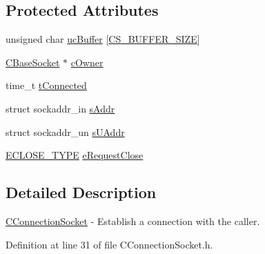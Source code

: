 \subsection*{\-Protected \-Attributes}
\begin{DoxyCompactItemize}
\item 
unsigned char \hyperlink{class_c_connection_socket_abc2fd15e5e9f2f3e112012bdbe0b5c94}{uc\-Buffer} \mbox{[}\hyperlink{class_c_connection_socket_a0d76efb3e65e70281ce2f12dc36dc329a5b96f929feebb30dc72b969542959beb}{\-C\-S\-\_\-\-B\-U\-F\-F\-E\-R\-\_\-\-S\-I\-Z\-E}\mbox{]}
\item 
\hyperlink{class_c_base_socket}{\-C\-Base\-Socket} $\ast$ \hyperlink{class_c_connection_socket_a0eb429ece7da6cfb9337fcf760087145}{c\-Owner}
\item 
time\-\_\-t \hyperlink{class_c_connection_socket_a831e97fbbea5727f1865f14cda4685cb}{t\-Connected}
\item 
struct sockaddr\-\_\-in \hyperlink{class_c_connection_socket_ad6faf61267b6f4a6f8d389a8bceac45d}{s\-Addr}
\item 
struct sockaddr\-\_\-un \hyperlink{class_c_connection_socket_aee6bfbd64246bf4c8be8b23acb9e124e}{s\-U\-Addr}
\item 
\hyperlink{class_c_connection_socket_a8a17c63c4d0bd7ea0041fbdbd3afc821}{\-E\-C\-L\-O\-S\-E\-\_\-\-T\-Y\-P\-E} \hyperlink{class_c_connection_socket_a60bbd36d27ad2d0efd579243857773ac}{e\-Request\-Close}
\end{DoxyCompactItemize}


\subsection{\-Detailed \-Description}
\hyperlink{class_c_connection_socket}{\-C\-Connection\-Socket} -\/ \-Establish a connection with the caller. 

\-Definition at line 31 of file \-C\-Connection\-Socket.\-h.



